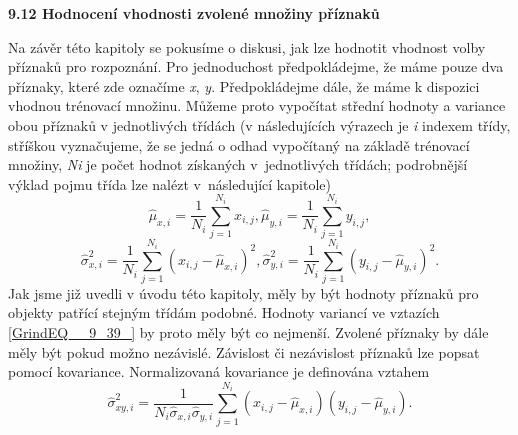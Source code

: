 \noindent 

\noindent \textbf{9.12  Hodnocení vhodnosti zvolené množiny příznaků}

\noindent Na závěr této kapitoly se pokusíme o diskusi, jak lze hodnotit vhodnost volby příznaků pro rozpoznání. Pro jednoduchost předpokládejme, že máme pouze dva příznaky, které zde označíme \textit{x}, \textit{y}. Předpokládejme dále, že máme k dispozici vhodnou trénovací množinu. Můžeme proto vypočítat střední hodnoty a variance obou příznaků v jednotlivých třídách (v následujících výrazech je \textit{i} indexem třídy, stříškou vyznačujeme, že se jedná o odhad vypočítaný na základě trénovací množiny, \textit{Ni} je počet hodnot získaných v~jednotlivých třídách; podrobnější výklad pojmu třída lze nalézt v~následující kapitole)  
\begin{equation} \label{GrindEQ__9_38_} 
\hat{\mu }_{x,i} =\frac{1}{N_{i} } \sum _{j=1}^{N_{i} }x_{i,j}  , \hat{\mu }_{y,i} =\frac{1}{N_{i} } \sum _{j=1}^{N_{i} }y_{i,j}  ,  
\end{equation} 
\begin{equation} \label{GrindEQ__9_39_} 
\hat{\sigma }_{x,i}^{2} =\frac{1}{N_{i} } \sum _{j=1}^{N_{i} }\left(x_{i,j} -\hat{\mu }_{x,i} \right)^{2}  , \hat{\sigma }_{y,i}^{2} =\frac{1}{N_{i} } \sum _{j=1}^{N_{i} }\left(y_{i,j} -\hat{\mu }_{y,i} \right)^{2}  .  
\end{equation} 
Jak jsme již uvedli v úvodu této kapitoly, měly by být hodnoty příznaků pro objekty patřící stejným třídám podobné. Hodnoty variancí ve vztazích \eqref{GrindEQ__9_39_} by proto měly být co nejmenší. Zvolené příznaky by dále měly být pokud možno nezávislé. Závislost či nezávislost příznaků lze popsat pomocí kovariance. Normalizovaná kovariance je definována vztahem 
\begin{equation} \label{GrindEQ__9_40_} 
\hat{\sigma }_{xy,i}^{2} =\frac{1}{N_{i} \hat{\sigma }_{x,i} \hat{\sigma }_{y,i} } \sum _{j=1}^{N_{i} }\left(x_{i,j} -\hat{\mu }_{x,i} \right)\left(y_{i,j} -\hat{\mu }_{y,i} \right) .  
\end{equation} 
